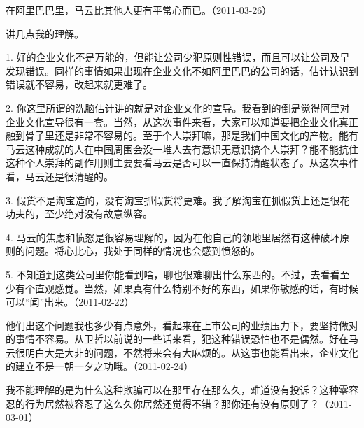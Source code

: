 在阿里巴巴里，马云比其他人更有平常心而已。（2011-03-26）


讲几点我的理解。

1. 好的企业文化不是万能的，但能让公司少犯原则性错误，而且可以让公司及早发现错误。同样的事情如果出现在企业文化不如阿里巴巴的公司的话，估计认识到错误就不容易，改起来就更难了。

2. 你这里所谓的洗脑估计讲的就是对企业文化的宣导。我看到的倒是觉得阿里对企业文化宣导很有一套。当然，从这次事件来看，大家可以知道要把企业文化真正融到骨子里还是非常不容易的。至于个人崇拜嘛，那是我们中国文化的产物。能有马云这种成就的人在中国周围会没一堆人去有意识无意识搞个人崇拜？能不能抗住这种个人崇拜的副作用则主要要看马云是否可以一直保持清醒状态了。从这次事件看，马云还是很清醒的。

3. 假货不是淘宝造的，没有淘宝抓假货将更难。我了解淘宝在抓假货上还是很花功夫的，至少绝对没有故意纵容。

4. 马云的焦虑和愤怒是很容易理解的，因为在他自己的领地里居然有这种破坏原则的问题。将心比心，我处于同样的情况也会感到愤怒的。

5. 不知道到这类公司里你能看到啥，聊也很难聊出什么东西的。不过，去看看至少有个直观感觉。当然，如果真有什么特别不好的东西，如果你敏感的话，有时候可以“闻”出来。（2011-02-22）

他们出这个问题我也多少有点意外，看起来在上市公司的业绩压力下，要坚持做对的事情不容易。从卫哲以前说的一些话来看，犯这种错误恐怕也不是偶然。好在马云很明白大是大非的问题，不然将来会有大麻烦的。从这事也能看出来，企业文化的建立不是一朝一夕之功哦。（2011-02-24）


我不能理解的是为什么这种欺骗可以在那里存在那么久，难道没有投诉？这种零容忍的行为居然被容忍了这么久你居然还觉得不错？那你还有没有原则了？（2011-03-01）



